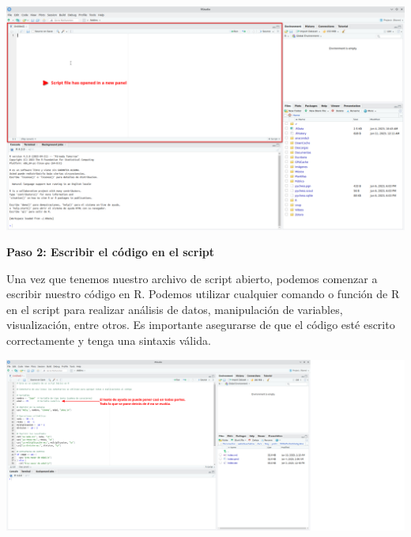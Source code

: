 \documentclass[
  a4paper,
]{article}
\begin{document}
\includegraphics{images/Screenshot_20230611_001615.png}

\textbf{Paso 2: Escribir el código en el script}

Una vez que tenemos nuestro archivo de script abierto, podemos comenzar
a escribir nuestro código en R. Podemos utilizar cualquier comando o
función de R en el script para realizar análisis de datos, manipulación
de variables, visualización, entre otros. Es importante asegurarse de
que el código esté escrito correctamente y tenga una sintaxis válida.

\includegraphics{images/Screenshot_20230611_004241.png}
\end{document}
